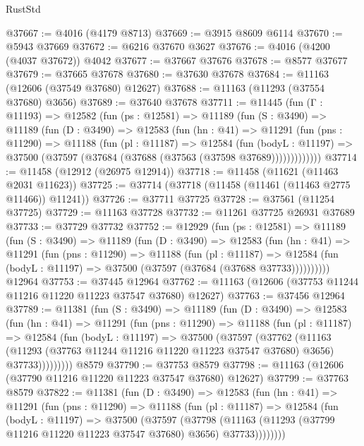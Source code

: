 \begin{lexlean}{RustStd}
\begin{coremodule}
@37667 := @4016 (@4179 @8713)
@37669 := @3915 @8609 @6114
@37670 := @5943 @37669
@37672 := @6216 @37670 @3627
@37676 := @4016 (@4200 (@4037 @37672)) @4042
@37677 := @37667 @37676
@37678 := @8577 @37677
@37679 := @37665 @37678
@37680 := @37630 @37678
@37684 := @11163 (@12606 (@37549 @37680) @12627)
@37688 := @11163 (@11293 (@37554 @37680) @3656)
@37689 := @37640 @37678
@37711 := @11445
    (fun (Γ : @11193) =>
    @12582
      (fun (ps : @12581) =>
      @11189
        (fun (S : @3490) =>
        @11189
          (fun (D : @3490) =>
          @12583
            (fun (hn : @41) =>
            @11291
              (fun (pns : @11290) =>
              @11188
                (fun (pl : @11187) =>
                @12584
                  (fun (bodyL : @11197) =>
                  @37500 (@37597 (@37684 (@37688 (@37563 (@37598 @37689)))))))))))))
@37714 := @11458 (@12912 (@26975 @12914))
@37718 := @11458 (@11621 (@11463 @2031 @11623))
@37725 := @37714 (@37718 (@11458 (@11461 (@11463 @2775 @11466)) @11241))
@37726 := @37711 @37725
@37728 := @37561 (@11254 @37725)
@37729 := @11163 @37728
@37732 := @11261 @37725 @26931 @37689
@37733 := @37729 @37732
@37752 := @12929
    (fun (ps : @12581) =>
    @11189
      (fun (S : @3490) =>
      @11189
        (fun (D : @3490) =>
        @12583
          (fun (hn : @41) =>
          @11291
            (fun (pns : @11290) =>
            @11188
              (fun (pl : @11187) =>
              @12584 (fun (bodyL : @11197) => @37500 (@37597 (@37684 (@37688 @37733))))))))))
    @12964
@37753 := @37445 @12964
@37762 := @11163 (@12606 (@37753 @11244 @11216 @11220 @11223 @37547 @37680) @12627)
@37763 := @37456 @12964
@37789 := @11381
    (fun (S : @3490) =>
    @11189
      (fun (D : @3490) =>
      @12583
        (fun (hn : @41) =>
        @11291
          (fun (pns : @11290) =>
          @11188
            (fun (pl : @11187) =>
            @12584
              (fun (bodyL : @11197) =>
              @37500
                (@37597
                  (@37762
                    (@11163
                      (@11293 (@37763 @11244 @11216 @11220 @11223 @37547 @37680) @3656)
                      @37733)))))))))
    @8579
@37790 := @37753 @8579
@37798 := @11163 (@12606 (@37790 @11216 @11220 @11223 @37547 @37680) @12627)
@37799 := @37763 @8579
@37822 := @11381
    (fun (D : @3490) =>
    @12583
      (fun (hn : @41) =>
      @11291
        (fun (pns : @11290) =>
        @11188
          (fun (pl : @11187) =>
          @12584
            (fun (bodyL : @11197) =>
            @37500
              (@37597
                (@37798
                  (@11163 (@11293 (@37799 @11216 @11220 @11223 @37547 @37680) @3656) @37733))))))))

\end{coremodule}
\end{lexlean}
